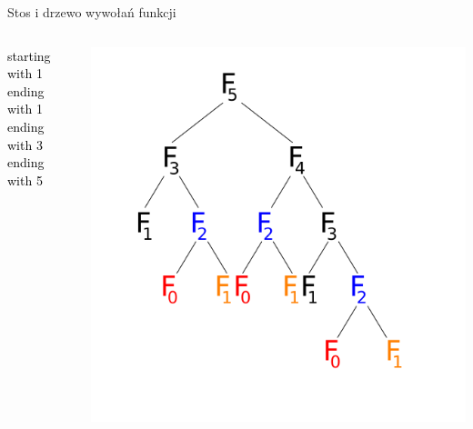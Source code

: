 \begin{frame}{Stos i drzewo wywołań funkcji}
\begin{columns}
\begin{column}{0.25\textwidth}
            \textcolor{black}{starting with 1}\\
            \textcolor{black}{ending with 1}\\
            \textcolor{black}{ending with 3}\\
            \textcolor{black}{ending with 5}\\
        \end{column}
        \begin{column}{0.5\textwidth}
            \includegraphics[width=\textwidth]{recursion/graphics/fibonacci_F3.png}
        \end{column}
    \end{columns}
\end{frame}
